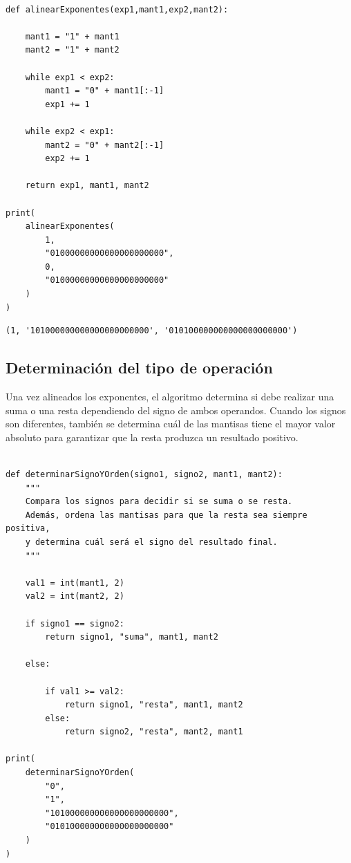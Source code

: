 \documentclass[11pt]{article}
\begin{document}
\begin{verbatim}

def alinearExponentes(exp1,mant1,exp2,mant2):

    mant1 = "1" + mant1
    mant2 = "1" + mant2

    while exp1 < exp2:
        mant1 = "0" + mant1[:-1]
        exp1 += 1

    while exp2 < exp1:
        mant2 = "0" + mant2[:-1]
        exp2 += 1

    return exp1, mant1, mant2

print(
    alinearExponentes(
        1,
        "01000000000000000000000",
        0,
        "01000000000000000000000"
    )
)
\end{verbatim}

\label{org0c05026}
\begin{verbatim}
(1, '101000000000000000000000', '010100000000000000000000')
\end{verbatim}
\subsection{Determinación del tipo de operación}
\label{sec:org1a6aa2b}

Una vez alineados los exponentes, el algoritmo determina si debe
realizar una suma o una resta dependiendo del signo de ambos
operandos. Cuando los signos son diferentes, también se determina
cuál de las mantisas tiene el mayor valor absoluto para garantizar
que la resta produzca un resultado positivo.

\begin{verbatim}

def determinarSignoYOrden(signo1, signo2, mant1, mant2):
    """
    Compara los signos para decidir si se suma o se resta.
    Además, ordena las mantisas para que la resta sea siempre positiva,
    y determina cuál será el signo del resultado final.
    """

    val1 = int(mant1, 2)
    val2 = int(mant2, 2)

    if signo1 == signo2:
        return signo1, "suma", mant1, mant2

    else:

        if val1 >= val2:
            return signo1, "resta", mant1, mant2
        else:
            return signo2, "resta", mant2, mant1

print(
    determinarSignoYOrden(
        "0",
        "1",
        "101000000000000000000000",
        "010100000000000000000000"
    )
)

\end{verbatim}
\end{document}
